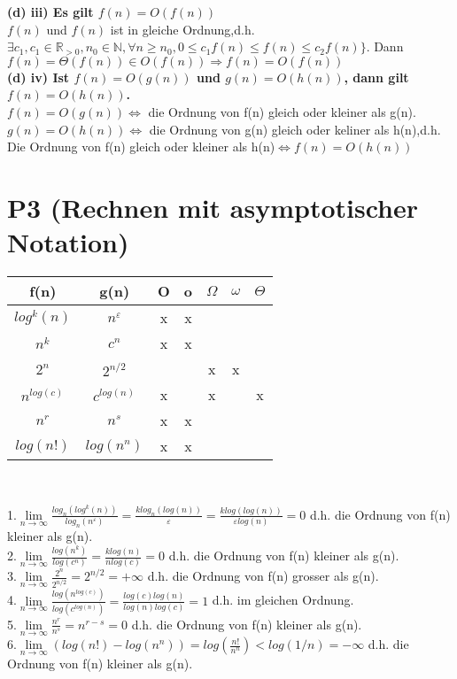 \documentclass[a4paper,12pt]{article}
\begin{document}
\textbf{(d) iii) Es gilt $f(n)=O(f(n))$}\\
$f(n)$ und $f(n)$ ist in gleiche Ordnung,d.h.$\exists c_{1},c_{1}\in\mathbb{R}_{>0},n_{0}\in\mathbb{N},\forall n\ge n_{0},0\le c_{1}f(n)\le f(n) \le c_{2}f(n) \rbrace$. Dann$f(n)=\Theta(f(n))\in O(f(n))\Rightarrow f(n)=O(f(n))$\\
\textbf{(d) iv) Ist $f(n)=O(g(n))$ und $g(n)=O(h(n))$, dann gilt $f(n)=O(h(n))$.}\\
$f(n)=O(g(n))\Leftrightarrow$ die Ordnung von f(n) gleich oder kleiner als g(n).$g(n)=O(h(n))\Leftrightarrow$ die Ordnung von g(n) gleich oder keliner als h(n),d.h. Die Ordnung von f(n) gleich oder kleiner als h(n)$\Leftrightarrow f(n)=O(h(n))$

\section{P3 (Rechnen mit asymptotischer Notation)}
\begin{center}
\begin{tabular}{c|c|c|c|c|c|c}
f(n)&g(n)&O&o&$\Omega$&$\omega$&$\Theta$\\
\hline  
$log^{k}(n)$&$n^{\varepsilon}$&x&x&&&\\
\hline
$n^{k}$&$c^{n}$&x&x&&&\\
\hline
$2^{n}$&$2^{n/2}$&&&x&x&\\
\hline
$n^{log(c)}$&$c^{log(n)}$&x&&x&&x\\
\hline
$n^{r}$&$n^{s}$&x&x&&&\\
\hline
$log(n!)$&$log(n^{n})$&x&x&&&\\
\end{tabular}\\
\end{center}
1.$\lim\limits_{n \to \infty} \frac{log_{n}(log^{k}(n))}{log_{n}(n^{\varepsilon})}=\frac{k log_{n}(log(n))}{\varepsilon}=\frac{klog(log(n))}{\varepsilon log(n)}=0$ d.h. die Ordnung von f(n) kleiner als g(n).\\
2.$\lim\limits_{n \to \infty} \frac{log(n^{k})}{log(c^{n})}=\frac{k log(n)}{n log(c)}=0$ d.h. die Ordnung von f(n) kleiner als g(n).\\
3.$\lim\limits_{n \to \infty} \frac{2^{n}}{2^{n/2}}=2^{n/2}=+\infty$ d.h. die Ordnung von f(n) grosser als g(n).\\
4.$\lim\limits_{n \to \infty} \frac{log(n^{log(c)})}{log(c^{log(n)})}=\frac{log(c)log(n)}{log(n)log(c)}=1$ d.h. im gleichen Ordnung.\\
5.$\lim\limits_{n \to \infty} \frac{n^{r}}{n^{s}}=n^{r-s}=0$ d.h. die Ordnung von f(n) kleiner als g(n).\\
6.$\lim\limits_{n \to \infty} (log(n!)-log(n^{n}))=log(\frac{n!}{n^{n}})<log(1/n)=-\infty$ d.h. die Ordnung von f(n) kleiner als g(n).
\end{document}
